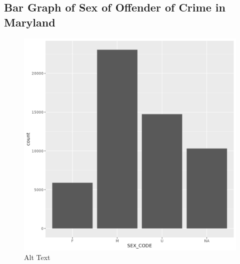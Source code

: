 \documentclass[
]{article}
\begin{document}
\hypertarget{bar-graph-of-sex-of-offender-of-crime-in-maryland}{%
\subsection{Bar Graph of Sex of Offender of Crime in
Maryland}\label{bar-graph-of-sex-of-offender-of-crime-in-maryland}}

\begin{figure}
\centering
\includegraphics{./figures/bar_sex_graph.png}
\caption{Alt Text}
\end{figure}
\end{document}
